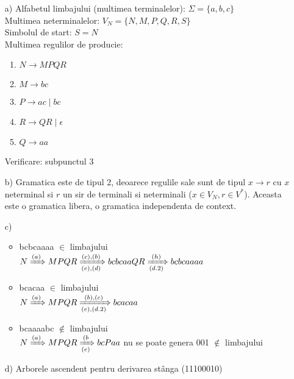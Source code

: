 \begin{enumerate}
\begin{enumerate}
\item[a)]
Alfabetul limbajului (multimea terminalelor):  
$\Sigma = \{a, b, c\}$ \\
Multimea neterminalelor:  
$V_N = \{N, M, P, Q, R, S\}$ \\
Simbolul de start: 
$S = N$ \\
Multimea regulilor de producie:

\begin{enumerate}
\item $N \rightarrow MPQR$
\item $M \rightarrow  bc$
\item $P \rightarrow ac \;|\; bc$
\item $R \rightarrow QR \; | \;  \epsilon$
\item $Q \rightarrow aa$
\end{enumerate}

Verificare: subpunctul 3

\item[b)]
Gramatica este de tipul 2, deoarece regulile sale sunt de tipul $x \rightarrow r$ cu $x$ neterminal si $r$ un sir de terminali si neterminali ($x \in V_{N}, r \in V^{\ast}$). Aceasta este o gramatica libera, o gramatica independenta de context.

\item[c)]
\begin{itemize}
\item bcbcaaaa $\in$ limbajului \\ 
$ N \xRightarrow{(a)} MPQR \xRightarrow[(e),(d)]{(c),(b)} bcbcaaQR \xRightarrow[(d.2)]{(h)} bcbcaaaa$     \;\; \checkmark \\
\item bcacaa $\in$ limbajului\\ 
$N \xRightarrow{(a)}MPQR \xRightarrow[(e),(d.2)]{(b),(c)} bcacaa$  \;\; \checkmark
\item bcaaaabc $\notin$ limbajului\\ 
$N \xRightarrow{(a)}MPQR \xRightarrow[(e)]{(b} bcPaa$  \;\; \checkmark  \; nu se poate genera 001 $\notin$ limbajului

\end{itemize}

\item[d)]
Arborele ascendent pentru derivarea stânga (11100010)


\end{enumerate}
\end{enumerate}
